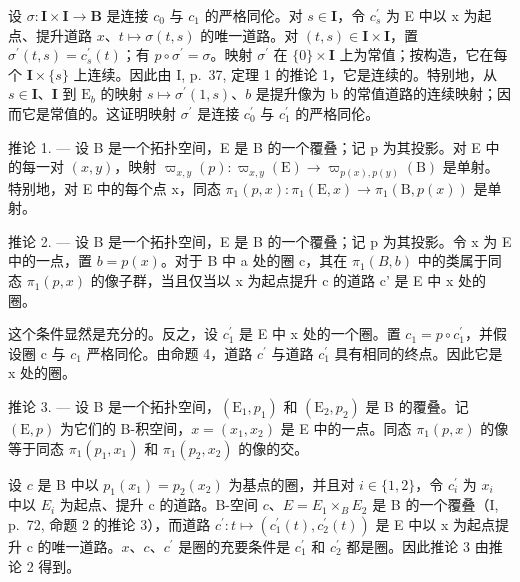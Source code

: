设 \(\sigma\colon\mathbf{I}\times\mathbf{I}\to\mathbf{B}\) 是连接 \(c_{0}\) 与 \(c_{1}\) 的严格同伦。对 \(s\in\mathbf{I}\)，令 \(c_{s}^{\prime}\) 为 E 中以 x 为起点、提升道路 \(x\)、\(t\mapsto\sigma(t,s)\) 的唯一道路。对 \((t,s)\in\mathbf{I}\times\mathbf{I}\)，置 \(\sigma^{\prime}(t,s)=c_{s}^{\prime}(t)\)；有 \(p\circ\sigma^{\prime}=\sigma\)。映射 \(\sigma^{\prime}\) 在 \(\{0\}\times\mathbf{I}\) 上为常值；按构造，它在每个 \(\mathbf{I}\times\{s\}\) 上连续。因此由 I, p.~37, 定理 1 的推论 1，它是连续的。特别地，从 \(s\in\mathbf{I}\)、\(\mathbf{I}\) 到 \(\mathrm{E}_{b}\) 的映射 \(s\mapsto\sigma^{\prime}(1,s)\)、\(b\) 是提升像为 b 的常值道路的连续映射；因而它是常值的。这证明映射 \(\sigma^{\prime}\) 是连接 \(c_{0}^{\prime}\) 与 \(c_{1}^{\prime}\) 的严格同伦。

推论 1. --- 设 B 是一个拓扑空间，E 是 B 的一个覆叠；记 p 为其投影。对 E 中的每一对 \((x,y)\)，映射 \(\varpi_{x,y}(p)\colon\varpi_{x,y}(\mathrm{E})\to\varpi_{p(x),p(y)}(\mathrm{B})\) 是单射。特别地，对 E 中的每个点 x，同态 \(\pi_{1}(p,x)\colon\pi_{1}(\mathrm{E},x)\to\pi_{1}(\mathrm{B},p(x))\) 是单射。

推论 2. --- 设 B 是一个拓扑空间，E 是 B 的一个覆叠；记 p 为其投影。令 x 为 E 中的一点，置 \(b = p(x)\)。对于 B 中 a 处的圈 c，其在 \(\pi_{1}(B, b)\) 中的类属于同态 \(\pi_{1}(p, x)\) 的像子群，当且仅当以 x 为起点提升 c 的道路 c' 是 E 中 x 处的圈。

这个条件显然是充分的。反之，设 \(c_{1}^{\prime}\) 是 E 中 x 处的一个圈。置 \(c_{1} = p \circ c_{1}^{\prime}\)，并假设圈 c 与 \(c_{1}\) 严格同伦。由命题 4，道路 \(c^{\prime}\) 与道路 \(c_{1}^{\prime}\) 具有相同的终点。因此它是 x 处的圈。

推论 3. --- 设 B 是一个拓扑空间，\((\mathrm{E}_{1}, p_{1})\) 和 \((\mathrm{E}_{2}, p_{2})\) 是 B 的覆叠。记 \((\mathrm{E}, p)\) 为它们的 B-积空间，\(x = (x_{1}, x_{2})\) 是 E 中的一点。同态 \(\pi_{1}(p, x)\) 的像等于同态 \(\pi_{1}(p_{1}, x_{1})\) 和 \(\pi_{1}(p_{2}, x_{2})\) 的像的交。

设 \(c\) 是 B 中以 \(p_{1}(x_{1}) = p_{2}(x_{2})\) 为基点的圈，并且对 \(i \in \{1, 2\}\)，令 \(c_{i}^{\prime}\) 为 \(x_i\) 中以 \(E_i\) 为起点、提升 c 的道路。B-空间 \(c\)、\(E = E_{1} \times_{B} E_{2}\) 是 B 的一个覆叠（I, p.~72, 命题 2 的推论 3），而道路 \(c^{\prime}: t \mapsto (c_{1}^{\prime}(t), c_{2}^{\prime}(t))\) 是 E 中以 x 为起点提升 c 的唯一道路。\(x\)、\(c\)、\(c^{\prime}\) 是圈的充要条件是 \(c_{1}^{\prime}\) 和 \(c_{2}^{\prime}\) 都是圈。因此推论 3 由推论 2 得到。

